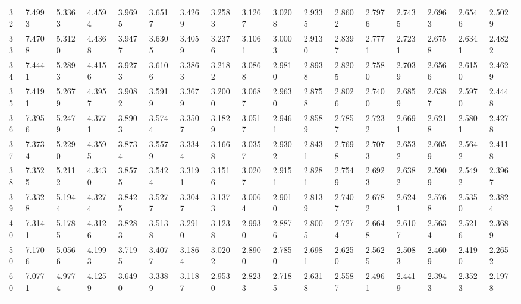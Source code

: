 {\begin{tabular}{|m{8pt}|m{18pt}*{15}{m{18pt}}}
 32 & 7.4993 & 5.3363 & 4.4594 & 3.9695 & 3.6517 & 3.4269 & 3.2583 & 3.1267 & 3.0208 & 2.9335 & 2.8602 & 2.7976 & 2.7435 & 2.6963 & 2.6546 & 2.5029 \\[2pt] \arrayrulecolor{light-gray}\hline\arrayrulecolor{black}  
 33 & 7.4708 & 5.3120 & 4.4368 & 3.9477 & 3.6305 & 3.4059 & 3.2376 & 3.1061 & 3.0003 & 2.9130 & 2.8397 & 2.7771 & 2.7231 & 2.6758 & 2.6341 & 2.4822 \\[2pt] \arrayrulecolor{light-gray}\hline\arrayrulecolor{black}  
 34 & 7.4441 & 5.2893 & 4.4156 & 3.9273 & 3.6106 & 3.3863 & 3.2182 & 3.0868 & 2.9810 & 2.8938 & 2.8205 & 2.7580 & 2.7039 & 2.6566 & 2.6150 & 2.4629 \\[2pt] \arrayrulecolor{light-gray}\hline\arrayrulecolor{black}  
 35 & 7.4191 & 5.2679 & 4.3957 & 3.9082 & 3.5919 & 3.3679 & 3.2000 & 3.0687 & 2.9630 & 2.8758 & 2.8026 & 2.7400 & 2.6859 & 2.6387 & 2.5970 & 2.4448 \\[2pt] \arrayrulecolor{light-gray}\hline\arrayrulecolor{black}  
 36 & 7.3956 & 5.2479 & 4.3771 & 3.8903 & 3.5744 & 3.3507 & 3.1829 & 3.0517 & 2.9461 & 2.8589 & 2.7857 & 2.7232 & 2.6691 & 2.6218 & 2.5801 & 2.4278 \\[2pt] \arrayrulecolor{light-gray}\hline\arrayrulecolor{black}  
 37 & 7.3734 & 5.2290 & 4.3595 & 3.8734 & 3.5579 & 3.3344 & 3.1668 & 3.0357 & 2.9302 & 2.8431 & 2.7698 & 2.7073 & 2.6532 & 2.6059 & 2.5642 & 2.4118 \\[2pt] \arrayrulecolor{light-gray}\hline\arrayrulecolor{black}  
 38 & 7.3525 & 5.2112 & 4.3430 & 3.8575 & 3.5424 & 3.3191 & 3.1516 & 3.0207 & 2.9151 & 2.8281 & 2.7549 & 2.6923 & 2.6382 & 2.5909 & 2.5492 & 2.3967 \\[2pt] \arrayrulecolor{light-gray}\hline\arrayrulecolor{black}  
 39 & 7.3328 & 5.1944 & 4.3274 & 3.8425 & 3.5277 & 3.3047 & 3.1373 & 3.0064 & 2.9010 & 2.8139 & 2.7407 & 2.6782 & 2.6241 & 2.5768 & 2.5350 & 2.3824 \\[2pt] \arrayrulecolor{light-gray}\hline\arrayrulecolor{black}  
 40 & 7.3141 & 5.1785 & 4.3126 & 3.8283 & 3.5138 & 3.2910 & 3.1238 & 2.9930 & 2.8876 & 2.8005 & 2.7274 & 2.6648 & 2.6107 & 2.5634 & 2.5216 & 2.3689 \\[2pt] \arrayrulecolor{light-gray}\hline\arrayrulecolor{black}  
 50 & 7.1706 & 5.0566 & 4.1993 & 3.7195 & 3.4077 & 3.1864 & 3.0202 & 2.8900 & 2.7850 & 2.6981 & 2.6250 & 2.5625 & 2.5083 & 2.4609 & 2.4190 & 2.2652 \\[2pt] \arrayrulecolor{light-gray}\hline\arrayrulecolor{black}  
 60 & 7.0771 & 4.9774 & 4.1259 & 3.6490 & 3.3389 & 3.1187 & 2.9530 & 2.8233 & 2.7185 & 2.6318 & 2.5587 & 2.4961 & 2.4419 & 2.3943 & 2.3523 & 2.1978 \\[2pt] \arrayrulecolor{light-gray}\hline\arrayrulecolor{black}  

\end{tabular}}
